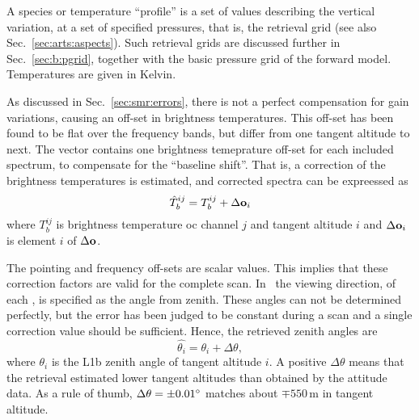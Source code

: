 A species or temperature ``profile'' is a set of values describing the vertical
variation, at a set of specified pressures, that is, the retrieval grid (see
also Sec.~\ref{sec:arts:aspects}). Such retrieval grids are discussed further
in Sec.~\ref{sec:b:pgrid}, together with the basic pressure grid of the forward
model. Temperatures are given in Kelvin.
\\

As discussed in Sec.~\ref{sec:smr:errors}, there is not a perfect compensation
for gain variations, causing an off-set in brightness temperatures. This
off-set has been found to be flat over the frequency bands, but differ from one
tangent altitude to next. The vector  contains one
brightness temeprature off-set for each included spectrum, to compensate for
the ``baseline shift''. That is, a correction of the brightness temperatures is
estimated, and corrected spectra can be expreessed as
\begin{equation}
  \label{eq:retr:baseline}
  \hat{T}_b^{ij} = T_b^{ij} + \Delta\mathbf{o}_i
\end{equation}
where $T_b^{ij}$ is brightness temperature oc channel $j$ and tangent altitude
$i$ and $\Delta\mathbf{o}_i$ is element $i$ of $\Delta\mathbf{o}$.


The pointing and frequency off-sets are scalar values. This implies that these
correction factors are valid for the complete scan. In \ARTS\ the viewing
direction, of each \LOS, is specified as the angle from zenith. These angles can
not be determined perfectly, but the error has been judged to be constant
during a scan and a single correction value should be sufficient. Hence, the
retrieved zenith angles are
\begin{equation}
  \label{eq:retr:point}
  \hat{\theta_i} = \theta_i + \Delta\theta,  
\end{equation}
where $\theta_i$ is the L1b zenith angle of tangent altitude $i$. A positive 
$\Delta\theta$ means that the retrieval estimated lower tangent altitudes than
obtained by the attitude data. As a rule of thumb, $\Delta\theta=\pm0.01^\circ$
matches about $\mp550$\,m in tangent altitude.

